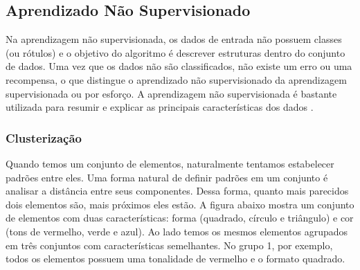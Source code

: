 \clearpage
\subsection{Aprendizado Não Supervisionado}

Na aprendizagem não supervisionada, os dados de entrada não possuem classes (ou rótulos) e o objetivo do algoritmo é descrever estruturas dentro do conjunto de dados. Uma vez que os dados não são classificados, não existe um erro ou uma recompensa, o que distingue o aprendizado não supervisionado da aprendizagem supervisionada ou por esforço. A aprendizagem não supervisionada é bastante utilizada para resumir e explicar as principais características dos dados \cite{jordan2004}.


\subsubsection{Clusterização}
\label{sec:clusterização}

Quando temos um conjunto de elementos, naturalmente tentamos estabelecer padrões entre eles. Uma forma natural de definir padrões em um conjunto é analisar a distância entre seus componentes. Dessa forma, quanto mais parecidos dois elementos são, mais próximos eles estão. A figura abaixo mostra um conjunto de elementos com duas características: forma (quadrado, círculo e triângulo) e cor (tons de vermelho, verde e azul). Ao lado temos os mesmos elementos agrupados em três conjuntos com características semelhantes. No grupo 1, por exemplo, todos os elementos possuem uma tonalidade de vermelho e o formato quadrado.

